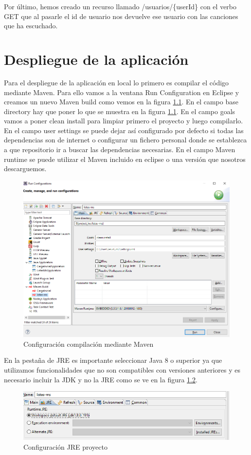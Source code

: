 \documentclass[12pt]{report} %
\begin{document}
Por último, hemos creado un recurso llamado /usuarios/\{userId\} con el verbo GET que al pasarle el id de usuario nos devuelve ese usuario con las canciones que ha escuchado.

\chapter{Despliegue de la aplicación}

Para el despliegue de la aplicación en local lo primero es compilar el código mediante Maven. Para ello vamos a la ventana Run Configuration en Eclipse y creamos un nuevo Maven build como vemos en la figura \ref{fig:cleaninstallmaven}. En el campo base directory hay que poner lo que se muestra en la figura \ref{fig:cleaninstallmaven}. En el campo goals vamos a poner clean install para limpiar primero el proyecto y luego compilarlo. En el campo user settings se puede dejar así configurado por defecto si todas las dependencias son de internet o configurar un fichero personal donde se establezca a que repositorio ir a buscar las dependencias necesarias. En el campo Maven runtime se puede utilizar el Maven incluido en eclipse o una versión que nosotros descarguemos.

\begin{figure}
	\centering
	\includegraphics[width=0.7\linewidth]{imagenes/cleanInstallMAven}
	\caption{Configuración compilación mediante Maven}
	\label{fig:cleaninstallmaven}
\end{figure}

En la pestaña de JRE es importante seleccionar Java 8 o superior ya que utilizamos funcionalidades que no son compatibles con versiones anteriores y es necesario incluir la JDK y no la JRE como se ve en la figura \ref{fig:jremaven}.

\begin{figure}
	\centering
	\includegraphics[width=0.7\linewidth]{imagenes/jreMaven}
	\caption{Configuración JRE proyecto}
	\label{fig:jremaven}
\end{figure}
\end{document}
